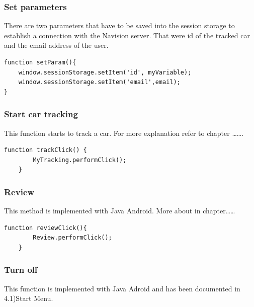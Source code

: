 \subsubsection{Set parameters}
There are two parameters that have to be saved into the session storage to establish a connection with the Navision server. That were id of the tracked car and the email address of the user.
\\
\begin{lstlisting}[language=html, caption= 
Set parameter function,captionpos=b]
function setParam(){
	window.sessionStorage.setItem('id', myVariable);
	window.sessionStorage.setItem('email',email);
}
\end{lstlisting}

\subsubsection{Start car tracking}
This function starts to track a car. For more explanation refer to chapter …….
\\

\begin{lstlisting}[language=html, caption= 
Car tracking function,captionpos=b]
function trackClick() {
        MyTracking.performClick();
    }
\end{lstlisting}

\subsubsection{Review}
This method is implemented with Java Android. More about in chapter……
\\

\begin{lstlisting}[language=html, caption= 
Review function,captionpos=b]
function reviewClick(){
        Review.performClick();
    }
\end{lstlisting}

\subsubsection{Turn off}
This function is implemented with Java Adroid and has been documented in 4.1)Start Menu.
\\

